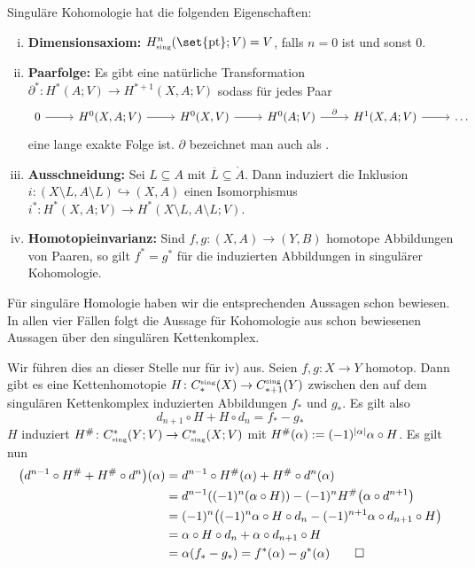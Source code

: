 \begin{satz}[{name=[Eigenschaften singulärer Kohomologie]}]
	Singuläre Kohomologie hat die folgenden Eigenschaften:
	\begin{enumerate}[i)]
		\item \textbf{Dimensionsaxiom:} $H^n_\sing(\set{\pt};V) = V$, falls $n=0$ ist und sonst $0$. 
		\item \textbf{Paarfolge:} Es gibt eine natürliche Transformation $\partial^*\colon H^*(A;V) \to H^{*+1}(X,A;V)$ sodass für jedes Paar 
		\[
			\begin{tikzcd}
				0 \rar & H^0(X,A;V) \rar & H^0(X,V) \rar & H^0(A;V) \rar["\partial"] & H^1(X,A;V) \rar & \ldots 
			\end{tikzcd}
		\]
		eine lange exakte Folge ist. $\partial$ bezeichnet man auch als .
		\item \textbf{Ausschneidung:} Sei $L \subseteq A$ mit $\overline{L} \subseteq \mathring{A}$. Dann induziert die Inklusion 
		$i \colon (X \setminus L, A \setminus L) \hookrightarrow (X,A)$ einen Isomorphismus $i^* \colon H^*(X,A;V) \to H^*(X \setminus L, A \setminus L;V)$.
		\item \textbf{Homotopieinvarianz:} Sind $f,g \colon (X,A) \to (Y,B)$ homotope Abbildungen von Paaren, so gilt $f^* = g^*$ für die induzierten Abbildungen in singulärer 
		Kohomologie.
	\end{enumerate}
\end{satz}
\begin{beweis}
	Für singuläre Homologie haben wir die entsprechenden Aussagen schon bewiesen. In allen vier Fällen folgt die Aussage für Kohomologie aus schon bewiesenen Aussagen über 
	den singulären Kettenkomplex.
	
	Wir führen dies an dieser Stelle nur für iv) aus. Seien $f, g \colon X \to Y$ homotop. Dann gibt es eine Kettenhomotopie $H \colon C^{\scriptscriptstyle\mathrm{sing}}_*(X) \to C^{\scriptscriptstyle\mathrm{sing}}_{*+1}(Y)$ zwischen den 
	auf dem singulären Kettenkomplex induzierten Abbildungen $f_*$ und $g_*$. Es gilt also 
	\[
		d_{n+1} \circ H + H \circ d_n = f_* - g_*
	\]
	$H$ induziert $H^\# \colon C^*_{\scriptscriptstyle\mathrm{sing}}(Y;V) \to C_{\scriptscriptstyle\mathrm{sing}}^*(X;V)$ mit $H^\#(\alpha) := (-1)^{\lvert\alpha\rvert} \alpha \circ H$. Es gilt nun
	\begin{align}
		\enbrace*{d^{n-1} \circ H^\# + H^\# \circ d^n}(\alpha) &= d^{n-1} \circ H^\#(\alpha) + H^\# \circ d^n (\alpha)\\
		&= d^{n-1} \enbrace*{(-1)^n(\alpha \circ H)} - (-1)^n
		H^\# \enbrace*{\alpha \circ d^{n+1}} \\
		&= (-1)^n \enbrace*{(-1)^{n} \alpha \circ H  \circ d_n - (-1)^{n+1} \alpha \circ d_{n+1} \circ H} \\
		&= \alpha \circ H \circ d_n + \alpha \circ d_{n+1} \circ H \\
		&= \alpha \enbrace*{f_* - g_*} = f^*(\alpha) - g^*(\alpha) \qedhere
	\end{align}
\end{beweis}

